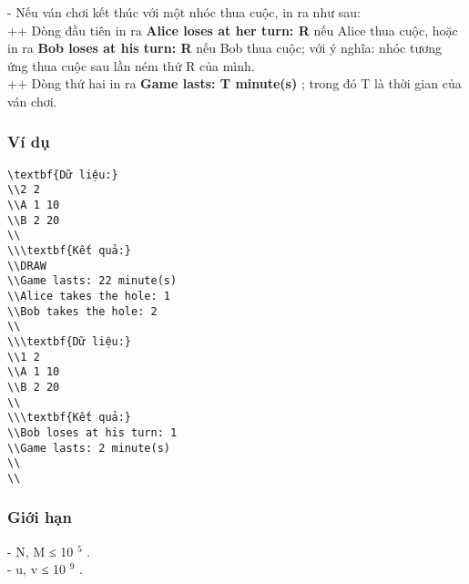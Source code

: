    - Nếu ván chơi kết thúc với một nhóc thua cuộc, in ra như sau:   
\\   ++ Dòng đầu tiên in ra   \textbf{    Alice loses at her turn: R   }   nếu Alice thua cuộc, hoặc in ra   \textbf{    Bob loses at his turn: R   }   nếu Bob thua cuộc; với ý nghĩa: nhóc tương ứng thua cuộc sau lần ném thứ R của mình.   
\\   ++ Dòng thứ hai in ra   \textbf{    Game lasts: T minute(s)   }   ; trong đó T là thời gian của ván chơi.  

\subsubsection{   Ví dụ  }
\begin{verbatim}
\textbf{Dữ liệu:}
\\2 2
\\A 1 10
\\B 2 20
\\
\\\textbf{Kết quả:}
\\DRAW
\\Game lasts: 22 minute(s)
\\Alice takes the hole: 1
\\Bob takes the hole: 2
\\
\\\textbf{Dữ liệu:}
\\1 2
\\A 1 10
\\B 2 20
\\
\\\textbf{Kết quả:}
\\Bob loses at his turn: 1
\\Game lasts: 2 minute(s)
\\
\\\end{verbatim}

\subsubsection{   Giới hạn  }

   - N, M ≤ 10   $^    5   $   .   
\\   - u, v ≤ 10   $^    9   $   .  

